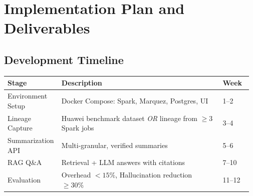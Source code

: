 \documentclass[9pt,letterpaper]{article}
\begin{document}



\section{Implementation Plan and Deliverables}

\subsection{Development Timeline}

\begin{table}[h!]
    \centering
    \begin{tabular}{p{0.20\linewidth} p{0.65\linewidth} p{0.12\linewidth}}
        \toprule
        \textbf{Stage}    & \textbf{Description}                                                  & \textbf{Week} \\
        \midrule
        Environment Setup & Docker Compose: Spark, Marquez, Postgres, UI                          & 1--2          \\
        Lineage Capture   & Huawei benchmark dataset \textit{OR} lineage from $\geq 3$ Spark jobs & 3--4          \\
        Summarization API & Multi-granular, verified summaries                                    & 5--6          \\
        RAG Q\&A          & Retrieval + LLM answers with citations                                & 7--10         \\
        Evaluation        & Overhead $<15\%$, Hallucination reduction $\geq 30\%$                 & 11--12        \\
        \bottomrule
    \end{tabular}
\end{table}
\end{document}
